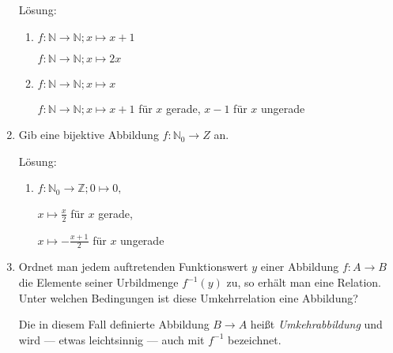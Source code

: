 \documentclass[main.tex]{subfiles}
\begin{document}
\begin{enumerate}
	      Lösung:
	      \begin{enumerate}
		      \item \( f:\mathbb{N} \rightarrow \mathbb{N}; x \mapsto x + 1 \)

		            \( f:\mathbb{N} \rightarrow \mathbb{N}; x \mapsto 2x \)

		      \item \( f:\mathbb{N} \rightarrow \mathbb{N}; x \mapsto x \)

		            \( f:\mathbb{N} \rightarrow \mathbb{N}; x \mapsto x + 1 \) für \( x \) gerade,
		            \( x - 1 \) für \( x \) ungerade

	      \end{enumerate}
	\item Gib eine bijektive Abbildung \( f: \mathbb{N}_0 \rightarrow Z \) an.

	      Lösung:
	      \begin{enumerate}
		      \item \( f: \mathbb{N}_0 \rightarrow \mathbb{Z}; 0 \mapsto 0, \)

		            \hspace{52pt}\( x \mapsto \frac{x}{2} \) für \( x \) gerade,

		            \hspace{52pt}\( x \mapsto - \frac{x + 1}{2} \) für \( x \) ungerade
	      \end{enumerate}
	\item Ordnet man jedem auftretenden Funktionswert \( y \) einer Abbildung  \( f: A \rightarrow B \)
	      die Elemente seiner Urbildmenge \( f^{-1}(y) \) zu, so erhält man eine Relation.
	      Unter welchen Bedingungen ist diese Umkehrrelation eine Abbildung?

	      Die in diesem Fall definierte Abbildung \( B \rightarrow A \) heißt \textit{Umkehrabbildung} und
	      wird — etwas leichtsinnig — auch mit \( f^{-1} \) bezeichnet.


\end{enumerate}
\end{document}
